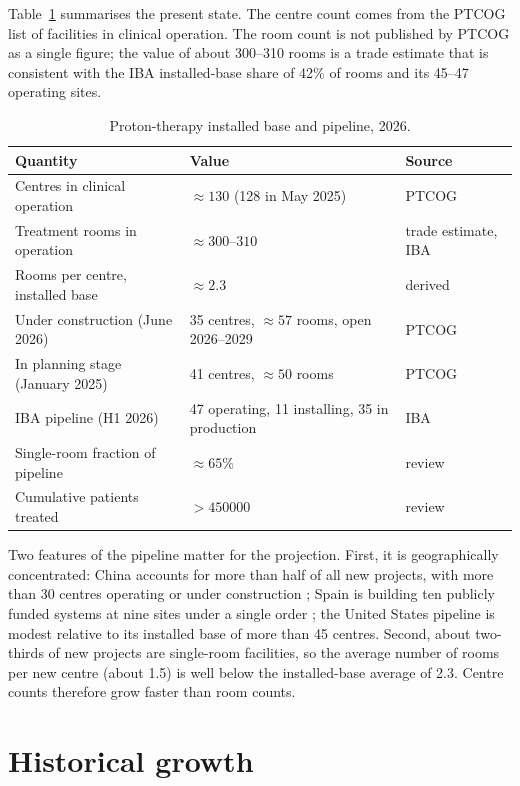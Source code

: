 \documentclass[11pt,a4paper]{article}
\begin{document}
Table~\ref{tab:today} summarises the present state. The centre count comes from
the PTCOG list of facilities in clinical operation. The room count is not
published by PTCOG as a single figure; the value of about 300--310 rooms is a
trade estimate that is consistent with the IBA installed-base share of 42\% of
rooms and its 45--47 operating sites.

\begin{table}[h]
\centering
\small
\caption{Proton-therapy installed base and pipeline, 2026.}
\label{tab:today}
\begin{tabular}{@{}lll@{}}
\toprule
Quantity & Value & Source \\
\midrule
Centres in clinical operation & $\approx 130$ (128 in May 2025) & PTCOG \cite{ptcog_map} \\
Treatment rooms in operation & $\approx 300$--$310$ & trade estimate, IBA \cite{iba_fy25} \\
Rooms per centre, installed base & $\approx 2.3$ & derived \\
Under construction (June 2026) & 35 centres, $\approx 57$ rooms, open 2026--2029 & PTCOG \cite{ptcog_construction} \\
In planning stage (January 2025) & 41 centres, $\approx 50$ rooms & PTCOG \cite{ptcog_planning} \\
IBA pipeline (H1 2026) & 47 operating, 11 installing, 35 in production & IBA \cite{iba_h1_26} \\
Single-room fraction of pipeline & $\approx 65\%$ & review \cite{frontiers2026} \\
Cumulative patients treated & $> \num{450000}$ & review \cite{frontiers2026} \\
\bottomrule
\end{tabular}
\end{table}

Two features of the pipeline matter for the projection. First, it is
geographically concentrated: China accounts for more than half of all new
projects, with more than 30 centres operating or under construction
\cite{frontiers2026}; Spain is building ten publicly funded systems at nine
sites under a single order \cite{iba_spain}; the United States pipeline is
modest relative to its installed base of more than 45 centres. Second, about
two-thirds of new projects are single-room facilities, so the average number of
rooms per new centre (about 1.5) is well below the installed-base average of
2.3. Centre counts therefore grow faster than room counts.

\section{Historical growth}
\end{document}

